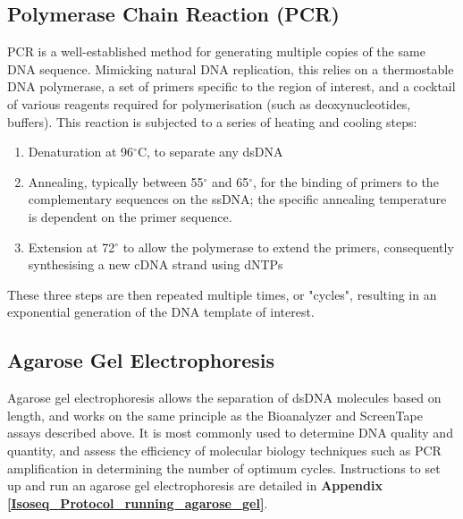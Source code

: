 \subsection{Polymerase Chain Reaction (PCR)}
\label{section:ch2_PCR_explanation} 
PCR is a well-established method for generating multiple copies of the same DNA sequence. Mimicking natural DNA replication, this relies on a thermostable DNA polymerase, a set of primers specific to the region of interest, and a cocktail of various reagents required for polymerisation (such as deoxynucleotides, buffers). This reaction is subjected to a series of heating and cooling steps: 
\begin{enumerate}
	\item Denaturation at 96$^{\circ}$C, to separate any dsDNA 
	\item Annealing, typically between 55$^{\circ}$  and 65$^{\circ}$, for the binding of primers to the complementary sequences on the ssDNA; the specific annealing temperature is dependent on the primer sequence. 
	\item Extension at 72$^{\circ}$ to allow the polymerase to extend the primers, consequently synthesising a new cDNA strand using dNTPs
\end{enumerate} 
These three steps are then repeated multiple times, or "cycles", resulting in an exponential generation of the DNA template of interest.

\subsection{Agarose Gel Electrophoresis}
\label{section:ch2_agarose_explanation}  
Agarose gel electrophoresis allows the separation of dsDNA molecules based on length, and works on the same principle as the Bioanalyzer and ScreenTape assays described above. It is most commonly used to determine DNA quality and quantity, and assess the efficiency of molecular biology techniques such as PCR amplification in determining the number of optimum cycles. Instructions to set up and run an agarose gel electrophoresis are detailed in \textbf{Appendix \ref{Isoseq_Protocol_running_agarose_gel}}.


